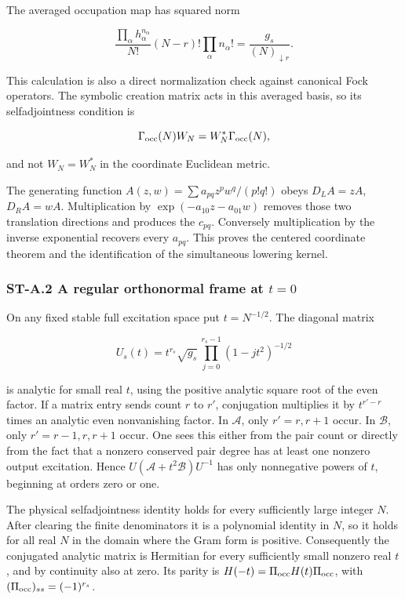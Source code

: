 The averaged occupation map has squared norm

\[
\frac{\prod_\alpha h_\alpha^{n_\alpha}}{N!}
(N-r)!\prod_\alpha n_\alpha!
=\frac{g_s}{(N)_{\downarrow r}}.
\]

This calculation is also a direct normalization check against canonical Fock operators. The symbolic creation matrix acts in this averaged basis, so its selfadjointness condition is

\[
\Gamma_{\rm occ}(N)W_N=W_N^*\Gamma_{\rm occ}(N),
\]

and not \(W_N=W_N^*\) in the coordinate Euclidean metric.

The generating function \(A(z,w)=\sum a_{pq}z^pw^q/(p!q!)\) obeys \(D_LA=zA\), \(D_RA=wA\). Multiplication by \(\exp(-a_{10}z-a_{01}w)\) removes those two translation directions and produces the \(c_{pq}\). Conversely multiplication by the inverse exponential recovers every \(a_{pq}\). This proves the centered coordinate theorem and the identification of the simultaneous lowering kernel.

\hypertarget{st-a.2-a-regular-orthonormal-frame-at-t0}{%
\subsubsection{\texorpdfstring{ST-A.2 A regular orthonormal frame at \(t=0\)}{ST-A.2 A regular orthonormal frame at t=0}}\label{st-a.2-a-regular-orthonormal-frame-at-t0}}

On any fixed stable full excitation space put \(t=N^{-1/2}\). The diagonal matrix

\[
U_s(t)=t^{r_s}\sqrt{g_s}\,
\prod_{j=0}^{r_s-1}(1-jt^2)^{-1/2}
\]

is analytic for small real \(t\), using the positive analytic square root of the even factor. If a matrix entry sends count \(r\) to \(r'\), conjugation multiplies it by \(t^{r'-r}\) times an analytic even nonvanishing factor. In \(\mathscr A\), only \(r'=r,r+1\) occur. In \(\mathscr B\), only \(r'=r-1,r,r+1\) occur. One sees this either from the pair count or directly from the fact that a nonzero conserved pair degree has at least one nonzero output excitation. Hence \(U(\mathscr A+t^2\mathscr B)U^{-1}\) has only nonnegative powers of \(t\), beginning at orders zero or one.

The physical selfadjointness identity holds for every sufficiently large integer \(N\). After clearing the finite denominators it is a polynomial identity in \(N\), so it holds for all real \(N\) in the domain where the Gram form is positive. Consequently the conjugated analytic matrix is Hermitian for every sufficiently small nonzero real \(t\), and by continuity also at zero. Its parity is \(H(-t)=\Pi_{\rm occ}H(t)\Pi_{\rm occ}\), with \((\Pi_{\rm occ})_{ss}=(-1)^{r_s}\).

